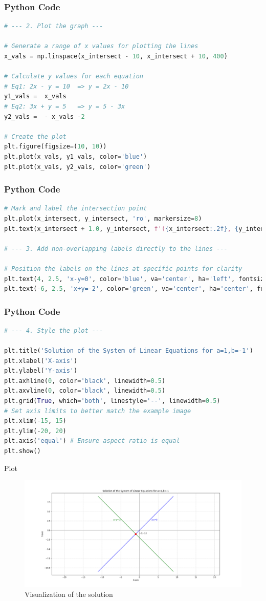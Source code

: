 \documentclass{beamer}
\begin{document}
\begin{frame}[fragile]
  \frametitle{Python Code}
  \begin{lstlisting}[language=Python]
# --- 2. Plot the graph ---

# Generate a range of x values for plotting the lines
x_vals = np.linspace(x_intersect - 10, x_intersect + 10, 400)

# Calculate y values for each equation
# Eq1: 2x - y = 10  => y = 2x - 10
y1_vals =  x_vals
# Eq2: 3x + y = 5   => y = 5 - 3x
y2_vals =  - x_vals -2

# Create the plot
plt.figure(figsize=(10, 10))
plt.plot(x_vals, y1_vals, color='blue')
plt.plot(x_vals, y2_vals, color='green')
   \end{lstlisting}
\end{frame}


\begin{frame}[fragile]
  \frametitle{Python Code}
  \begin{lstlisting}[language=Python]
# Mark and label the intersection point
plt.plot(x_intersect, y_intersect, 'ro', markersize=8)
plt.text(x_intersect + 1.0, y_intersect, f'({x_intersect:.2f}, {y_intersect:.2f})', fontsize=12, va='center')

# --- 3. Add non-overlapping labels directly to the lines ---

# Position the labels on the lines at specific points for clarity
plt.text(4, 2.5, 'x-y=0', color='blue', va='center', ha='left', fontsize=11)
plt.text(-6, 2.5, 'x+y=-2', color='green', va='center', ha='center', fontsize=11)
   \end{lstlisting}
\end{frame}

\begin{frame}[fragile]
  \frametitle{Python Code}
  \begin{lstlisting}[language=Python]
# --- 4. Style the plot ---

plt.title('Solution of the System of Linear Equations for a=1,b=-1')
plt.xlabel('X-axis')
plt.ylabel('Y-axis')
plt.axhline(0, color='black', linewidth=0.5)
plt.axvline(0, color='black', linewidth=0.5)
plt.grid(True, which='both', linestyle='--', linewidth=0.5)
# Set axis limits to better match the example image
plt.xlim(-15, 15)
plt.ylim(-20, 20)
plt.axis('equal') # Ensure aspect ratio is equal
plt.show()
   \end{lstlisting}
\end{frame}


\begin{frame}{Plot}
  \begin{figure}
    \centering
    \includegraphics[width=\textwidth]{../figs/figure_py.png}
    \caption{Visualization of the solution}
    \label{fig:final_plot}
  \end{figure}
\end{frame}
\end{document}

